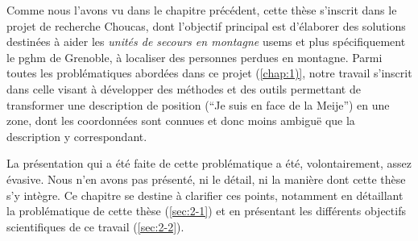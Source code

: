 Comme nous l'avons vu dans le chapitre précédent, cette thèse
s'inscrit dans le projet de recherche Choucas, dont l'objectif
principal est d’élaborer des solutions destinées à aider les
\emph{unités de secours en montagne} \acp{usem} et plus spécifiquement
le \ac{pghm} de Grenoble, à localiser des personnes perdues en
montagne. Parmi toutes les problématiques abordées dans ce projet
(\autoref{chap:1)}, notre travail s'inscrit dans celle visant à
développer des méthodes et des outils permettant de transformer une
description de position (\eg \enquote{Je suis en face de la Meije}) en
une zone, dont les coordonnées sont connues et donc moins ambiguë que
la description y correspondant.

La présentation qui a été faite de cette problématique a été,
volontairement, assez évasive. Nous n'en avons pas présenté, ni le
détail, ni la manière dont cette thèse s'y intègre. Ce chapitre se
destine à clarifier ces points, notamment en détaillant la
problématique de cette thèse (\autoref{sec:2-1}) et en présentant les
différents objectifs scientifiques de ce travail (\autoref{sec:2-2}).

